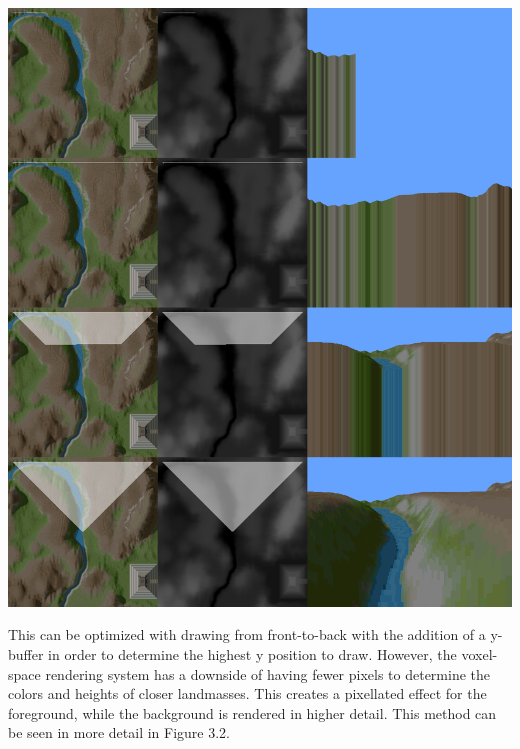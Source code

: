 \documentclass[10pt]{report}
\begin{document}
		\begin{minipage}{\textwidth}
			\centering
			\includegraphics[scale=.2]{line-by-line}
			\label{fig:fig3}
		\end{minipage}
	
		This can be optimized with drawing from front-to-back with the addition of a y-buffer in order to determine the highest y position to draw. However, the voxel-space rendering system has a downside of having fewer pixels to determine the colors and heights of closer landmasses. This creates a pixellated effect for the foreground, while the background is rendered in higher detail. This method can be seen in more detail in Figure 3.2. 
		 
\end{document}
